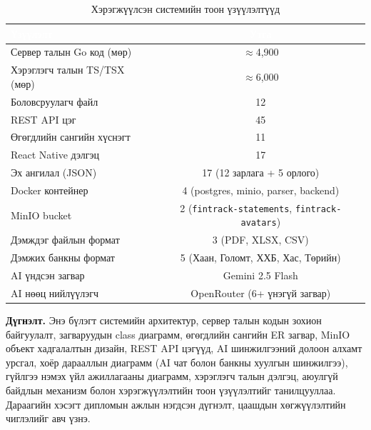\begin{table}[ht]
\centering
\footnotesize
\renewcommand{\arraystretch}{1.25}
\begin{tabular}{|p{7cm}|c|}
\hline
\rowcolor{darknavy}
\textcolor{white}{\textbf{Үзүүлэлт}} & \textcolor{white}{\textbf{Утга}} \\ \hline
Сервер талын Go код (мөр)         & $\approx$4{,}900 \\ \hline
Хэрэглэгч талын TS/TSX (мөр)      & $\approx$6{,}000 \\ \hline
Боловсруулагч файл                & 12 \\ \hline
REST API цэг                      & 45 \\ \hline
Өгөгдлийн сангийн хүснэгт         & 11 \\ \hline
React Native дэлгэц               & 17 \\ \hline
Эх ангилал (JSON)                 & 17 (12 зарлага + 5 орлого) \\ \hline
Docker контейнер                  & 4 (postgres, minio, parser, backend) \\ \hline
MinIO bucket                       & 2 (\texttt{fintrack-statements}, \texttt{fintrack-avatars}) \\ \hline
Дэмждэг файлын формат             & 3 (PDF, XLSX, CSV) \\ \hline
Дэмжих банкны формат              & 5 (Хаан, Голомт, ХХБ, Хас, Төрийн) \\ \hline
AI үндсэн загвар                  & Gemini 2.5 Flash \\ \hline
AI нөөц нийлүүлэгч                  & OpenRouter (6+ үнэгүй загвар) \\ \hline
\end{tabular}
\caption{Хэрэгжүүлсэн системийн тоон үзүүлэлтүүд}
\label{tab:metrics}
\end{table}

\textbf{Дүгнэлт.} Энэ бүлэгт системийн архитектур, сервер талын кодын зохион байгуулалт, загваруудын class диаграмм, өгөгдлийн сангийн ER загвар, MinIO объект хадгалалтын дизайн, REST API цэгүүд, AI шинжилгээний долоон алхамт урсгал, хоёр дарааллын диаграмм (AI чат болон банкны хуулгын шинжилгээ), гүйлгээ нэмэх үйл ажиллагааны диаграмм, хэрэглэгч талын дэлгэц, аюулгүй байдлын механизм болон хэрэгжүүлэлтийн тоон үзүүлэлтийг танилцууллаа. Дараагийн хэсэгт дипломын ажлын нэгдсэн дүгнэлт, цаашдын хөгжүүлэлтийн чиглэлийг авч үзнэ.
